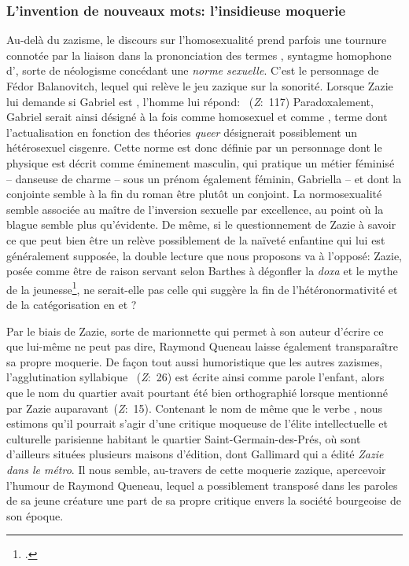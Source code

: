 \subsubsection{L'invention de nouveaux mots: l'insidieuse moquerie}
Au-delà du zazisme, le discours sur l'homosexualité prend parfois une tournure connotée par la liaison dans la prononciation des termes , syntagme homophone d', sorte de néologisme concédant une \textit{norme sexuelle}.
C'est le personnage de Fédor Balanovitch, lequel  qui relève le jeu zazique sur la sonorité.
Lorsque Zazie lui demande si Gabriel est , l'homme lui répond: ~(\textit{Z}:~117)
Paradoxalement, Gabriel serait ainsi désigné à la fois comme homosexuel et comme , terme dont l'actualisation en fonction des théories \textit{queer} désignerait possiblement un hétérosexuel cisgenre.
Cette norme est donc définie par un personnage dont le physique est décrit comme éminement masculin, qui pratique un métier féminisé -- danseuse de charme -- sous un prénom également féminin, Gabriella -- et dont la conjointe semble à la fin du roman être plutôt un conjoint.
La normosexualité semble associée au maître de l'inversion sexuelle par excellence, au point où la blague semble plus qu'évidente.
De même, si le questionnement de Zazie à savoir ce que peut bien être un  relève possiblement de la naïveté enfantine qui lui est généralement supposée, la double lecture que nous proposons va à l'opposé: Zazie, posée comme être de raison servant selon Barthes à dégonfler la \textit{doxa} et le mythe de la jeunesse\footcite{Barthes1964}, ne serait-elle pas celle qui suggère la fin de l'hétéronormativité et de la catégorisation en  et ?
\par
Par le biais de Zazie, sorte de marionnette qui permet à son auteur d'écrire ce que lui-même ne peut pas dire, Raymond Queneau laisse également transparaître sa propre moquerie.
De façon tout aussi humoristique que les autres zazismes, l'agglutination syllabique ~(\textit{Z}:~26) est écrite ainsi comme parole l'enfant, alors que le nom du quartier avait pourtant été bien orthographié lorsque mentionné par Zazie auparavant~(\textit{Z}:~15).
Contenant le nom  de même que le verbe , nous estimons qu'il pourrait s'agir d'une critique moqueuse de l'élite intellectuelle et culturelle parisienne habitant le quartier Saint-Germain-des-Prés, où sont d'ailleurs situées plusieurs maisons d'édition, dont Gallimard qui a édité \textit{Zazie dans le métro}.
Il nous semble, au-travers de cette moquerie zazique, apercevoir l'humour de Raymond Queneau, lequel a possiblement transposé dans les paroles de sa jeune créature une part de sa propre critique envers la société bourgeoise de son époque.

